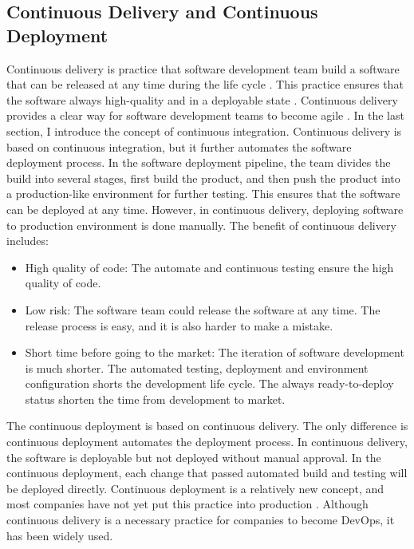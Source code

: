 \subsection{Continuous Delivery and Continuous Deployment}
\label{CD}
Continuous delivery is practice that software development team build a software that can be released at any time during the life cycle \cite{fowler2013continuous}. This practice ensures that the software always high-quality and in a deployable state \cite{WhatisCo47:online}. Continuous delivery provides a clear way for software development teams to become agile \cite{Whyagile27:online}\cite{IsContin85:online}. In the last section, I introduce the concept of continuous integration.  Continuous delivery is based on continuous integration, but it further automates the software deployment process. In the software deployment pipeline, the team divides the build into several stages, first build the product, and then push the product into a production-like environment for further testing. This ensures that the software can be deployed at any time. However, in continuous delivery, deploying software to production environment is done manually.
The benefit \cite{WhatisCo47:online}\cite{fowler2013continuous} of continuous delivery includes:
\begin{itemize}
    \item High quality of code: The automate and continuous testing ensure the high quality of code.
    \item Low risk: The software team could release the software at any time. The release process is easy, and it is also harder to make a mistake.
    \item Short time before going to the market: The iteration of software development is much shorter. The automated testing, deployment and environment configuration shorts the development life cycle. The always ready-to-deploy status shorten the time from development to market.
\end{itemize}
The continuous deployment is based on continuous delivery. The only difference is continuous deployment automates the deployment process. In continuous delivery, the software is deployable but not deployed without manual approval. In the continuous deployment, each change that passed automated build and testing will be deployed directly.
Continuous deployment is a relatively new concept, and most companies have not yet put this practice into production \cite{leppanen2015highways}. Although continuous delivery is a necessary practice for companies to become DevOps, it has been widely used.
